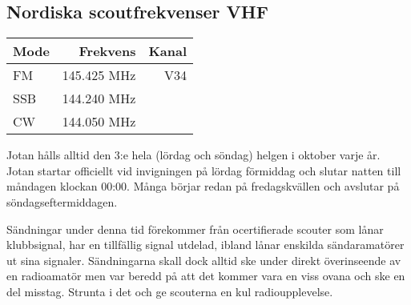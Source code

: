 \subsection{Nordiska scoutfrekvenser VHF}

\begin{center}
\begin{tabular}{lrr}
	\textbf{Mode} & \textbf{Frekvens} & \textbf{Kanal} \\ \hline
	FM            &      145.425  MHz &   V34 \\
	SSB           &      144.240  MHz &  \\
	CW            &      144.050  MHz &
\end{tabular}
\end{center}

Jotan hålls alltid den 3:e hela (lördag och söndag) helgen i oktober
varje år. Jotan startar officiellt vid invigningen på lördag förmiddag
och slutar natten till måndagen klockan 00:00. Många börjar redan på
fredagskvällen och avslutar på söndagseftermiddagen.

Sändningar under denna tid förekommer från ocertifierade scouter som
lånar klubbsignal, har en tillfällig signal utdelad, ibland lånar
enskilda sändaramatörer ut sina signaler. Sändningarna skall dock
alltid ske under direkt överinseende av en radioamatör men var beredd
på att det kommer vara en viss ovana och ske en del misstag. Strunta i
det och ge scouterna en kul radioupplevelse.


